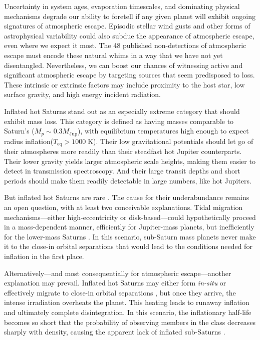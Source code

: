 \documentclass[twocolumn]{aastex631}
\begin{document}
Uncertainty in system ages, evaporation timescales, and dominating physical mechanisms degrade our ability to foretell if any given planet will exhibit ongoing signatures of atmospheric escape.  Episodic stellar wind gusts and other forms of astrophysical variability could also subdue the appearance of atmospheric escape, even where we expect it most.  The 48 published non-detections of atmospheric escape \citep{2022arXiv221116243D} must encode these natural whims in a way that we have not yet disentangled. Nevertheless, we can boost our chances of witnessing active and significant atmospheric escape by targeting sources that seem predisposed to loss.  These intrinsic or extrinsic factors may include proximity to the host star, low surface gravity, and high energy incident radiation.

Inflated hot Saturns stand out as an especially extreme category that should exhibit mass loss.  This category is defined as having masses comparable to Saturn's ($M_p \sim 0.3 M_\mathrm{Jup}$), with equilibrium temperatures high enough to expect radius inflation($T_\mathrm{eq}>1000\;$K).  Their low gravitational potentials should let go of their atmospheres more readily than their steadfast hot Jupiter counterparts.  Their lower gravity yields larger atmospheric scale heights, making them easier to detect in transmission spectroscopy.  And their large transit depths and short periods should make them readily detectable in large numbers, like hot Jupiters.

But inflated hot Saturns are rare \citep{2018AJ....155..214T}.  The cause for their underabundance remains an open question, with at least two conceivable explanations.  Tidal migration mechanisms---either high-eccentricity or disk-based---could hypothetically proceed in a mass-dependent manner, efficiently for Jupiter-mass planets, but inefficiently for the lower-mass Saturns \citep{2018AJ....155..214T,2018ARA&A..56..175D}.  In this scenario, sub-Saturn mass planets never make it to the close-in orbital separations that would lead to the conditions needed for inflation in the first place.

Alternatively---and most consequentially for atmospheric escape---another explanation may prevail.  Inflated hot Saturns may either form \emph{in-situ} or effectively migrate to close-in orbital separations \citep{2018ARA&A..56..175D}, but once they arrive, the intense irradiation overheats the planet.  This heating leads to runaway inflation and ultimately complete disintegration.  In this scenario, the inflationary half-life becomes so short that the probability of observing members in the class decreases sharply with density, causing the apparent lack of inflated sub-Saturns \citep{2023ApJ...945L..36T}.
\end{document}
